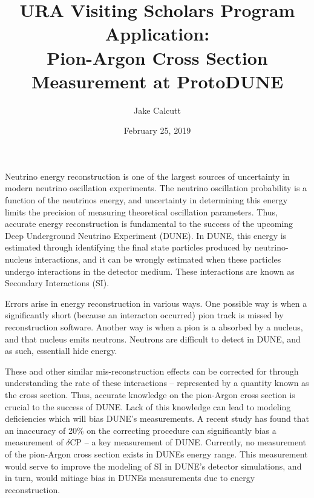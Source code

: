 \documentclass[12pt]{article}
\title{ \large \textbf{URA Visiting Scholars Program Application:} \\
\large Pion-Argon Cross Section Measurement at ProtoDUNE}
\date{February 25, 2019}
\begin{document}
\author{Jake Calcutt}

\maketitle
\thispagestyle{fancy}


Neutrino energy reconstruction is one of the largest sources of uncertainty in modern neutrino
oscillation experiments. The neutrino oscillation probability is a function of the neutrino\textquotesingle s energy, and uncertainty in determining this energy limits the precision of measuring theoretical oscillation parameters. Thus, accurate energy reconstruction is fundamental to the success of the upcoming Deep Underground Neutrino Experiment (DUNE).  In DUNE, this energy is estimated through identifying the final state particles produced by neutrino-nucleus interactions, and it can be wrongly estimated when these particles undergo interactions in the detector medium. These interactions are known as Secondary Interactions (SI).
  
	Errors arise in energy reconstruction in various ways. One possible way is when a significantly short (because an interacton occurred) pion track is missed by reconstruction software. Another way is when a pion is a absorbed by a nucleus, and that nucleus emits neutrons. Neutrons are difficult to detect in DUNE, and as such, essentiall hide energy. 
	
	These and other similar mis-reconstruction effects can be corrected for through understanding the rate of these interactions -- represented by a quantity known as the cross section. Thus, accurate knowledge on the pion-Argon cross section is crucial to the success of DUNE. Lack of this knowledge can lead to modeling deficiencies which will bias DUNE’s measurements. A recent study\cite{AnkowskiEtAl} has found that an inaccuracy of 20\% on the correcting procedure can significantly bias a measurement of  $\delta$CP -- a key measurement of DUNE. Currently, no measurement of the pion-Argon cross section exists in DUNE\textquotesingle s energy range. This measurement would serve to improve the modeling of SI in DUNE’s detector simulations, and in turn, would mitiage bias in DUNE\textquotesingle s measurements due to energy reconstruction.
\\

\end{document}
